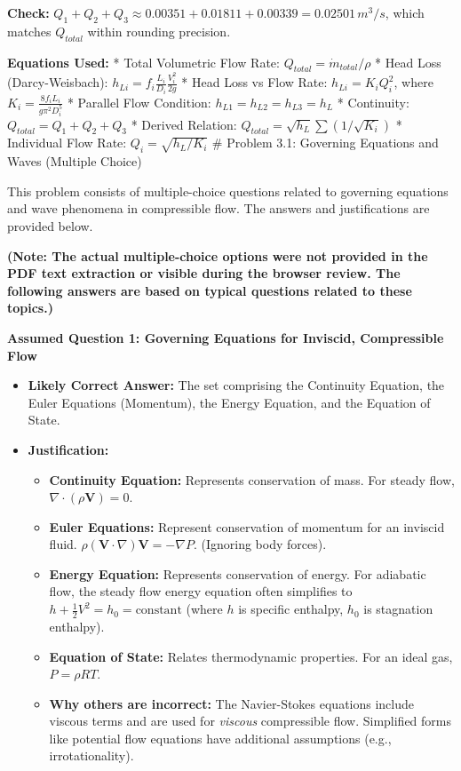 \textbf{Check:}
\(Q_1 + Q_2 + Q_3 \approx 0.00351 + 0.01811 + 0.00339 = 0.02501 \, m^3/s\),
which matches \(Q_{total}\) within rounding precision.

\textbf{Equations Used:} * Total Volumetric Flow Rate:
\(Q_{total} = \dot{m}_{total} / \rho\) * Head Loss (Darcy-Weisbach):
\(h_{Li} = f_i \frac{L_i}{D_i} \frac{V_i^2}{2g}\) * Head Loss vs Flow
Rate: \(h_{Li} = K_i Q_i^2\), where
\(K_i = \frac{8 f_i L_i}{g \pi^2 D_i^5}\) * Parallel Flow Condition:
\(h_{L1} = h_{L2} = h_{L3} = h_L\) * Continuity:
\(Q_{total} = Q_1 + Q_2 + Q_3\) * Derived Relation:
\(Q_{total} = \sqrt{h_L} \sum (1/\sqrt{K_i})\) * Individual Flow Rate:
\(Q_i = \sqrt{h_L / K_i}\) \# Problem 3.1: Governing Equations and Waves
(Multiple Choice)

This problem consists of multiple-choice questions related to governing
equations and wave phenomena in compressible flow. The answers and
justifications are provided below.

\textbf{(Note: The actual multiple-choice options were not provided in
the PDF text extraction or visible during the browser review. The
following answers are based on typical questions related to these
topics.)}

\textbf{Assumed Question 1: Governing Equations for Inviscid,
Compressible Flow}

\begin{itemize}
\tightlist
\item
  \textbf{Likely Correct Answer:} The set comprising the Continuity
  Equation, the Euler Equations (Momentum), the Energy Equation, and the
  Equation of State.
\item
  \textbf{Justification:}

  \begin{itemize}
  \tightlist
  \item
    \textbf{Continuity Equation:} Represents conservation of mass. For
    steady flow, \(\nabla \cdot (\rho \mathbf{V}) = 0\).
  \item
    \textbf{Euler Equations:} Represent conservation of momentum for an
    inviscid fluid.
    \(\rho (\mathbf{V} \cdot \nabla) \mathbf{V} = -\nabla P\). (Ignoring
    body forces).
  \item
    \textbf{Energy Equation:} Represents conservation of energy. For
    adiabatic flow, the steady flow energy equation often simplifies to
    \(h + \frac{1}{2}V^2 = h_0 = \text{constant}\) (where \(h\) is
    specific enthalpy, \(h_0\) is stagnation enthalpy).
  \item
    \textbf{Equation of State:} Relates thermodynamic properties. For an
    ideal gas, \(P = \rho R T\).
  \item
    \textbf{Why others are incorrect:} The Navier-Stokes equations
    include viscous terms and are used for \emph{viscous} compressible
    flow. Simplified forms like potential flow equations have additional
    assumptions (e.g., irrotationality).
  \end{itemize}
\end{itemize}

